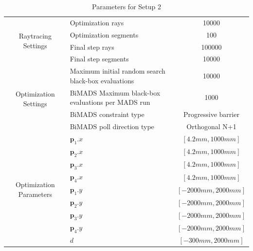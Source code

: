 \documentclass[a4paper,10pt]{article}
\renewcommand{\vec}[1]{\mathbf{#1}}
\begin{document}
    \begin{table}
    \centering
    \setlength\tabcolsep{8pt}
    \renewcommand{\arraystretch}{1.5}
    \begin{tabular}{| c | p{40mm} | c |}
        \hline
        \multirow{4}{*}{Raytracing Settings} & Optimization rays & 10000 \\
        \cline{2-3}
        & Optimization segments & 100 \\
        \cline{2-3}
        & Final step rays & 100000 \\
        \cline{2-3}
        & Final step segments & 10000 \\
        \hline
        \multirow{4}{*}{Optimization Settings} & Maximum initial random search black-box evaluations & 10000 \\
        \cline{2-3}
        & BiMADS Maximum black-box evaluations per MADS run & 1000 \\
        \cline{2-3}
        & BiMADS constraint type & Progressive barrier \\
        \cline{2-3}
        & BiMADS poll direction type & Orthogonal N+1 \\
        \hline
        \multirow{9}{*}{Optimization Parameters} & 
        $\vec{p}_1.x$ & $[4.2mm, 1000mm]$ \\
        \cline{2-3}
        & $\vec{p}_2.x$ & $[4.2mm, 1000mm]$\\
        \cline{2-3}
        & $\vec{p}_3.x$ & $[4.2mm, 1000mm]$\\ 
        \cline{2-3}
        & $\vec{p}_4.x$ & $[4.2mm, 1000mm]$\\ 
        \cline{2-3}
        & $\vec{p}_1.y$ & $[-2000mm, 2000mm]$ \\
        \cline{2-3}
        & $\vec{p}_2.y$ & $[-2000mm, 2000mm]$\\
        \cline{2-3}
        & $\vec{p}_3.y$ & $[-2000mm, 2000mm]$\\ 
        \cline{2-3}
        & $\vec{p}_4.y$ & $[-2000mm, 2000mm]$\\ 
        \cline{2-3}
        & $d$ & $[-300mm, 2000mm]$\\ 
        \hline 
    \end{tabular}
    \caption{Parameters for Setup 2}
    \label{tab:setup2_parameters}
    \end{table}
\end{document}
